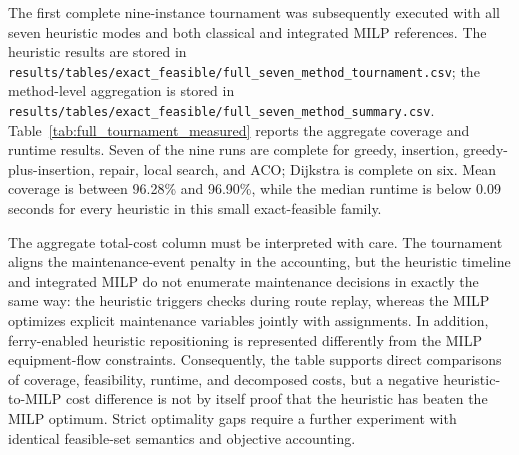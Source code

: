 The first complete nine-instance tournament was subsequently executed with all
seven heuristic modes and both classical and integrated MILP references. The
heuristic results are stored in
\texttt{results/tables/exact\_feasible/full\_seven\_method\_tournament.csv};
the method-level aggregation is stored in
\texttt{results/tables/exact\_feasible/full\_seven\_method\_summary.csv}.
Table~\ref{tab:full_tournament_measured} reports the aggregate coverage and
runtime results. Seven of the nine runs are complete for greedy, insertion,
greedy-plus-insertion, repair, local search, and ACO; Dijkstra is complete on
six. Mean coverage is between 96.28\% and 96.90\%, while the median runtime is
below 0.09 seconds for every heuristic in this small exact-feasible family.

\begin{table}[t]
\centering\small
\caption{Measured seven-heuristic tournament on the nine-instance
exact-feasible family. Values are aggregated over instances; complete counts
refer to schedules assigning all flights.}
\label{tab:full_tournament_measured}
\end{table}

The aggregate total-cost column must be interpreted with care. The tournament
aligns the maintenance-event penalty in the accounting, but the heuristic
timeline and integrated MILP do not enumerate maintenance decisions in exactly
the same way: the heuristic triggers checks during route replay, whereas the
MILP optimizes explicit maintenance variables jointly with assignments. In
addition, ferry-enabled heuristic repositioning is represented differently from
the MILP equipment-flow constraints. Consequently, the table supports direct
comparisons of coverage, feasibility, runtime, and decomposed costs, but a
negative heuristic-to-MILP cost difference is not by itself proof that the
heuristic has beaten the MILP optimum. Strict optimality gaps require a further
experiment with identical feasible-set semantics and objective accounting.

